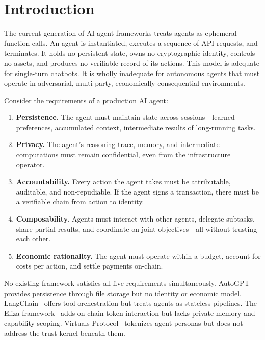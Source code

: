 \section{Introduction}
\label{sec:intro}

The current generation of AI agent frameworks treats agents as ephemeral function calls. An agent is instantiated, executes a sequence of API requests, and terminates. It holds no persistent state, owns no cryptographic identity, controls no assets, and produces no verifiable record of its actions. This model is adequate for single-turn chatbots. It is wholly inadequate for autonomous agents that must operate in adversarial, multi-party, economically consequential environments.

Consider the requirements of a production AI agent:

\begin{enumerate}[label=(\roman*)]
    \item \textbf{Persistence.} The agent must maintain state across sessions---learned preferences, accumulated context, intermediate results of long-running tasks.
    \item \textbf{Privacy.} The agent's reasoning trace, memory, and intermediate computations must remain confidential, even from the infrastructure operator.
    \item \textbf{Accountability.} Every action the agent takes must be attributable, auditable, and non-repudiable. If the agent signs a transaction, there must be a verifiable chain from action to identity.
    \item \textbf{Composability.} Agents must interact with other agents, delegate subtasks, share partial results, and coordinate on joint objectives---all without trusting each other.
    \item \textbf{Economic rationality.} The agent must operate within a budget, account for costs per action, and settle payments on-chain.
\end{enumerate}

No existing framework satisfies all five requirements simultaneously. AutoGPT~\cite{autogpt2023} provides persistence through file storage but no identity or economic model. LangChain~\cite{langchain2023} offers tool orchestration but treats agents as stateless pipelines. The Eliza framework~\cite{ai16z2024eliza} adds on-chain token interaction but lacks private memory and capability scoping. Virtuals Protocol~\cite{virtuals2024} tokenizes agent personas but does not address the trust kernel beneath them.

